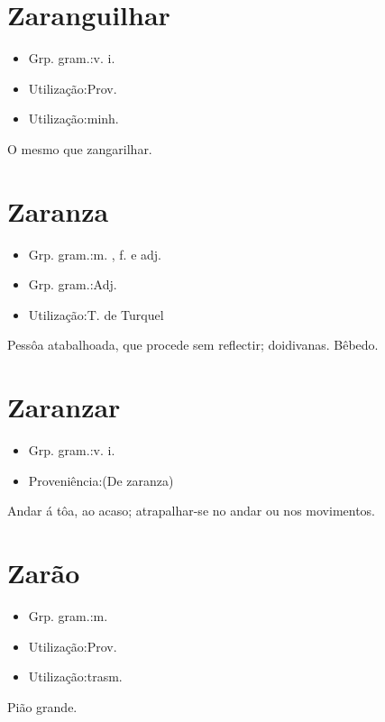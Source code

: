 \section{Zaranguilhar}
\begin{itemize}
\item {Grp. gram.:v. i.}
\end{itemize}
\begin{itemize}
\item {Utilização:Prov.}
\end{itemize}
\begin{itemize}
\item {Utilização:minh.}
\end{itemize}
O mesmo que \textunderscore zangarilhar\textunderscore .
\section{Zaranza}
\begin{itemize}
\item {Grp. gram.:m. ,  f.  e  adj.}
\end{itemize}
\begin{itemize}
\item {Grp. gram.:Adj.}
\end{itemize}
\begin{itemize}
\item {Utilização:T. de Turquel}
\end{itemize}
Pessôa atabalhoada, que procede sem reflectir; doidivanas.
Bêbedo.
\section{Zaranzar}
\begin{itemize}
\item {Grp. gram.:v. i.}
\end{itemize}
\begin{itemize}
\item {Proveniência:(De \textunderscore zaranza\textunderscore )}
\end{itemize}
Andar á tôa, ao acaso; atrapalhar-se no andar ou nos movimentos.
\section{Zarão}
\begin{itemize}
\item {Grp. gram.:m.}
\end{itemize}
\begin{itemize}
\item {Utilização:Prov.}
\end{itemize}
\begin{itemize}
\item {Utilização:trasm.}
\end{itemize}
Pião grande.
